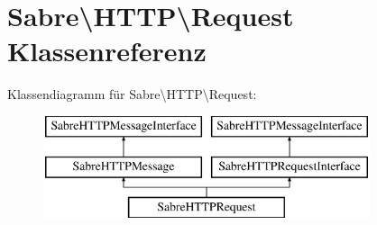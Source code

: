 \hypertarget{class_sabre_1_1_h_t_t_p_1_1_request}{}\section{Sabre\textbackslash{}H\+T\+TP\textbackslash{}Request Klassenreferenz}
\label{class_sabre_1_1_h_t_t_p_1_1_request}
Klassendiagramm für Sabre\textbackslash{}H\+T\+TP\textbackslash{}Request\+:\begin{figure}[H]
\begin{center}
\leavevmode
\includegraphics[height=3.000000cm]{class_sabre_1_1_h_t_t_p_1_1_request}
\end{center}
\end{figure}
